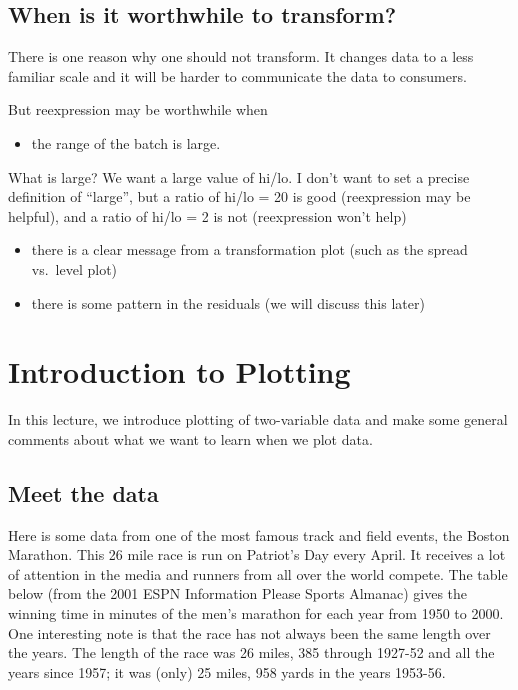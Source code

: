 \documentclass[
]{book}
\providecommand{\tightlist}{%
  \setlength{\itemsep}{0pt}\setlength{\parskip}{0pt}}
\begin{document}
\hypertarget{when-is-it-worthwhile-to-transform}{%
\section{When is it worthwhile to transform?}\label{when-is-it-worthwhile-to-transform}}

There is one reason why one should not transform. It changes data to a less familiar scale and it will be harder to communicate the data to consumers.

But reexpression may be worthwhile when

\begin{itemize}
\tightlist
\item
  the range of the batch is large.
\end{itemize}

What is large? We want a large value of hi/lo. I don't want to set a precise definition of ``large'', but a ratio of hi/lo = 20 is good (reexpression may be helpful), and a ratio of hi/lo = 2 is not (reexpression won't help)

\begin{itemize}
\item
  there is a clear message from a transformation plot (such as the spread vs.~level plot)
\item
  there is some pattern in the residuals (we will discuss this later)
\end{itemize}

\hypertarget{introduction-to-plotting}{%
\chapter{Introduction to Plotting}\label{introduction-to-plotting}}

In this lecture, we introduce plotting of two-variable data and make some general comments about what we want to learn when we plot data.

\hypertarget{meet-the-data-2}{%
\section{Meet the data}\label{meet-the-data-2}}

Here is some data from one of the most famous track and field events, the Boston Marathon. This 26 mile race is run on Patriot's Day every April. It receives a lot of attention in the media and runners from all over the world compete. The table below (from the 2001 ESPN Information Please Sports Almanac) gives the winning time in minutes of the men's marathon for each year from 1950 to 2000. One interesting note is that the race has not always been the same length over the years. The length of the race was 26 miles, 385 through 1927-52 and all the years since 1957; it was (only) 25 miles, 958 yards in the years 1953-56.
\end{document}
